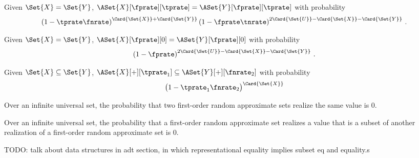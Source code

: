 \documentclass[ ../main.tex]{subfiles}
\begin{document}
\begin{corollary}
	Given $\Set{X} = \Set{Y}$, $\ASet{X}[\fprate][\tprate] = \ASet{Y}[\fprate][\tprate]$ with probability
	\begin{equation}
	\left(1 - \tprate\fnrate\right)^{\Card{\Set{X}}+\Card{\Set{Y}}}
	\left(1 - \fprate\tnrate\right)^{2 \Card{\Set{U}} - \Card{\Set{X}} - \Card{\Set{Y}}}\,.
	\end{equation}
\end{corollary}


\begin{corollary}
	Given $\Set{X} = \Set{Y}$, $\ASet{X}[\fprate][0] = \ASet{Y}[\fprate][0]$ with probability
	\begin{equation}
	\left(1 - \fprate\right)^{2 \Card{\Set{U}} - \Card{\Set{X}} - \Card{\Set{Y}}}\,.
	\end{equation}
\end{corollary}

\begin{corollary}
	Given $\Set{X} \subseteq \Set{Y}$, $\ASet{X}[+][\tprate_1] \subseteq \ASet{Y}[+][\fnrate_2]$ with probability
	\begin{equation}
	\left(1 - \tprate_1\fnrate_2\right)^{\Card{\Set{X}}}
	\end{equation}
\end{corollary}




\begin{corollary}
	Over an infinite universal set, the probability that two first-order random approximate sets realize the same value is $0$.
\end{corollary}


\begin{corollary}
	Over an infinite universal set, the probability that a first-order random approximate set realizes a value that is a subset of another realization of a first-order random approximate set is $0$.
\end{corollary}

TODO: talk about data structures in adt section, in which representational equality implies subset eq and equality.s
\end{document}
